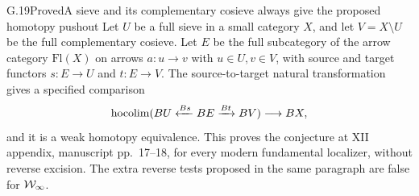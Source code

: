 \begin{claim}{G.19}{Proved}{A sieve and its complementary cosieve always give the proposed homotopy pushout}
Let $U$ be a full sieve in a small category $X$, and let $V=X\setminus U$ be the full complementary cosieve. Let $E$ be the full subcategory of the arrow category $\mathrm{Fl}(X)$ on arrows $a:u\to v$ with $u\in U,v\in V$, with source and target functors $s:E\to U$ and $t:E\to V$. The source-to-target natural transformation gives a specified comparison
\[
\operatorname{hocolim}(BU\xleftarrow{Bs}BE\xrightarrow{Bt}BV)\longrightarrow BX,
\]
and it is a weak homotopy equivalence. This proves the conjecture at XII appendix, manuscript pp.~17--18, for every modern fundamental localizer, without reverse excision. The extra reverse tests proposed in the same paragraph are false for $\mathcal{W}_{\infty}$.
\end{claim}
